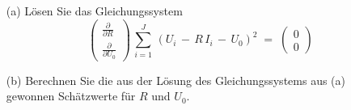 \documentclass[a4paper,12pt,DIV=15]{scrartcl}
\begin{document}
\begin{itemize}
\item[(a)] Lösen Sie das Gleichungssystem
\begin{equation}
\left(\begin{array}{c}
\frac{\partial}{\partial R}\\
\frac{\partial}{\partial U_0}
\end{array}\right)
\, \sum_{i = 1}^J \, \left(U_i \, - \, R \, I_i  \, - \,  U_0\right)^2 \; = \;
\left(\begin{array}{c}
0\\
0
\end{array}\right)
\label{regrGerGS}
\end{equation}
\item[(b)] Berechnen Sie die aus der Lösung des Gleichungssystems aus (a) gewonnen Schätzwerte
für $R$ und $U_0$.
\end{itemize}
\end{document}
